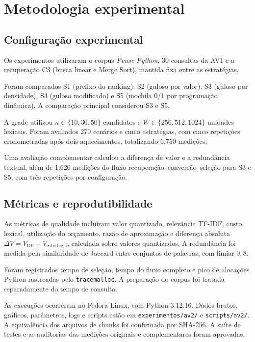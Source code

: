 \documentclass[11pt,a4paper]{article}
\theoremstyle{plain}
\theoremstyle{definition}
\theoremstyle{plain}
\begin{document}
\section{Metodologia experimental}
\label{sec:metodologia}

\subsection{Configuração experimental}

Os experimentos utilizaram o corpus \textit{Pense Python},
30 consultas da AV1 e a recuperação C3 (busca linear
e Merge Sort), mantida fixa entre as estratégias.

Foram comparados S1 (prefixo do ranking),
S2 (guloso por valor), S3 (guloso por densidade),
S4 (guloso modificado) e S5 (mochila 0/1 por
programação dinâmica). A comparação principal
considerou S3 e S5.

A grade utilizou $n\in\{10,30,50\}$ candidatos e
$W\in\{256,512,1024\}$ unidades lexicais.
Foram avaliados 270 cenários e cinco estratégias,
com cinco repetições cronometradas após dois
aquecimentos, totalizando 6.750 medições.

Uma avaliação complementar calculou a diferença
de valor e a redundância textual, além de 1.620
medições do fluxo recuperação--conversão--seleção
para S3 e S5, com três repetições por configuração.

\subsection{Métricas e reprodutibilidade}

As métricas de qualidade incluíram valor quantizado,
relevância TF-IDF, custo lexical, utilização do orçamento,
razão de aproximação e diferença absoluta
$\Delta V=V_{\mathrm{DP}}-V_{\mathrm{estrategia}}$,
calculada sobre valores quantizados.
A redundância foi medida pela similaridade de Jaccard
entre conjuntos de palavras, com limiar $0{,}8$.

Foram registrados tempo de seleção, tempo do fluxo
completo e pico de alocações Python rastreadas
pelo \texttt{tracemalloc}. A preparação do corpus
foi tratada separadamente do tempo de consulta.

As execuções ocorreram no Fedora Linux, com
Python 3.12.16. Dados brutos, gráficos, parâmetros,
logs e scripts estão em \texttt{experimentos/av2/}
e \texttt{scripts/av2/}. A equivalência dos arquivos
de chunks foi confirmada por SHA-256.
A suíte de testes e as auditorias das medições
originais e complementares foram aprovadas.
\end{document}
